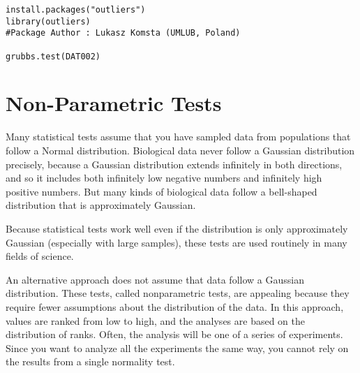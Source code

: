 \documentclass[MdouleBmain.tex]{subfiles}
\begin{document}
\begin{framed}
\begin{verbatim}
install.packages("outliers")
library(outliers)
#Package Author : Lukasz Komsta (UMLUB, Poland)

grubbs.test(DAT002)
\end{verbatim}
\end{framed}



\section{Non-Parametric Tests}
Many statistical tests assume that you have sampled data from populations that follow a Normal distribution. 
Biological data never follow a Gaussian distribution precisely, because a Gaussian distribution extends infinitely in both directions, and so it includes both infinitely low negative numbers and infinitely high positive numbers. But many kinds of biological data follow a bell-shaped distribution that is approximately Gaussian. 

Because statistical tests work well even if the distribution is only approximately Gaussian (especially with large samples), these tests are used routinely in many fields of science.

An alternative approach does not assume that data follow a Gaussian distribution. These tests, called nonparametric tests, are appealing because they require fewer assumptions about the distribution of the data. In this approach, values are ranked from low to high, and the analyses are based on the distribution of ranks.
Often, the analysis will be one of a series of experiments. Since you want to analyze all the experiments the same way, you cannot rely on the results from a single normality test.
\end{document}

